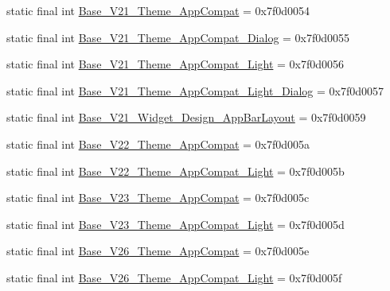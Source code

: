 \begin{DoxyCompactItemize}
\item 
static final int \mbox{\hyperlink{classandroid_1_1support_1_1design_1_1_r_1_1style_a045c026a1af92dd4ce48bf60c97acc81}{Base\+\_\+\+V21\+\_\+\+Theme\+\_\+\+App\+Compat}} = 0x7f0d0054
\item 
static final int \mbox{\hyperlink{classandroid_1_1support_1_1design_1_1_r_1_1style_a51e2e39ba5d5b1fee8e36f3f94ba322c}{Base\+\_\+\+V21\+\_\+\+Theme\+\_\+\+App\+Compat\+\_\+\+Dialog}} = 0x7f0d0055
\item 
static final int \mbox{\hyperlink{classandroid_1_1support_1_1design_1_1_r_1_1style_a556541f7e4e26b1bcb1ff6453aabb3f3}{Base\+\_\+\+V21\+\_\+\+Theme\+\_\+\+App\+Compat\+\_\+\+Light}} = 0x7f0d0056
\item 
static final int \mbox{\hyperlink{classandroid_1_1support_1_1design_1_1_r_1_1style_a48e4536d181ab3cb02271d068b3c5443}{Base\+\_\+\+V21\+\_\+\+Theme\+\_\+\+App\+Compat\+\_\+\+Light\+\_\+\+Dialog}} = 0x7f0d0057
\item 
static final int \mbox{\hyperlink{classandroid_1_1support_1_1design_1_1_r_1_1style_ae7c941fba583ed0b9bf119441b8b0100}{Base\+\_\+\+V21\+\_\+\+Widget\+\_\+\+Design\+\_\+\+App\+Bar\+Layout}} = 0x7f0d0059
\item 
static final int \mbox{\hyperlink{classandroid_1_1support_1_1design_1_1_r_1_1style_aa23076039edd6ad473bdc34aa6d8547b}{Base\+\_\+\+V22\+\_\+\+Theme\+\_\+\+App\+Compat}} = 0x7f0d005a
\item 
static final int \mbox{\hyperlink{classandroid_1_1support_1_1design_1_1_r_1_1style_abd60acce4aabee6976bca2367aa5772c}{Base\+\_\+\+V22\+\_\+\+Theme\+\_\+\+App\+Compat\+\_\+\+Light}} = 0x7f0d005b
\item 
static final int \mbox{\hyperlink{classandroid_1_1support_1_1design_1_1_r_1_1style_a51ae26e7db14e3694ad3a1407c77696c}{Base\+\_\+\+V23\+\_\+\+Theme\+\_\+\+App\+Compat}} = 0x7f0d005c
\item 
static final int \mbox{\hyperlink{classandroid_1_1support_1_1design_1_1_r_1_1style_a590015dcac5ee7ee1c7f82e7db386a8f}{Base\+\_\+\+V23\+\_\+\+Theme\+\_\+\+App\+Compat\+\_\+\+Light}} = 0x7f0d005d
\item 
static final int \mbox{\hyperlink{classandroid_1_1support_1_1design_1_1_r_1_1style_a09704c0df33345e12308b906d1972a60}{Base\+\_\+\+V26\+\_\+\+Theme\+\_\+\+App\+Compat}} = 0x7f0d005e
\item 
static final int \mbox{\hyperlink{classandroid_1_1support_1_1design_1_1_r_1_1style_a6c4cf900dd54a5d45948d4dc180ec73a}{Base\+\_\+\+V26\+\_\+\+Theme\+\_\+\+App\+Compat\+\_\+\+Light}} = 0x7f0d005f

\end{DoxyCompactItemize}
